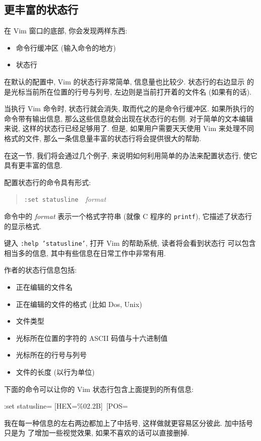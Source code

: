 \subsection{更丰富的状态行}
\label{subsec:a_more_informative_status_line}
在 Vim 窗口的底部, 你会发现两样东西:
\begin{itemize}
    \item 命令行缓冲区 (输入命令的地方)
    \item 状态行
\end{itemize}
在默认的配置中, Vim 的状态行非常简单, 信息量也比较少. 状态行的右边显示
的是光标当前所在位置的行号与列号, 左边则是当前打开着的文件名 (如果有的话).

当执行 Vim 命令时, 状态行就会消失, 取而代之的是命令行缓冲区. 如果所执行的
命令带有输出信息, 那么这些信息就会出现在状态行的右侧.
对于简单的文本编辑来说, 这样的状态行已经足够用了. 但是, 如果用户需要天天使用
Vim 来处理不同格式的文件, 那么一条信息量丰富的状态行将会提供很大的帮助.

在这一节, 我们将会通过几个例子, 来说明如何利用简单的办法来配置状态行, 使它
具有更丰富的信息.

配置状态行的命令具有形式:
\begin{quotation}
\texttt{:set statusline}\ \ \textit{format}
\end{quotation}
命令中的 \textit{format} 表示一个格式字符串 (就像 C 程序的 \texttt{printf}),
它描述了状态行的显示格式.

键入 \texttt{:help 'statusline'}, 打开 Vim 的帮助系统, 读者将会看到状态行
可以包含相当多的信息, 其中有些信息在日常工作中非常有用.

作者的状态行信息包括:
\begin{itemize}
    \item 正在编辑的文件名
    \item 正在编辑的文件的格式 (比如 Dos, Unix)
    \item 文件类型
    \item 光标所在位置的字符的 ASCII 码值与十六进制值
    \item 光标所在的行号与列号
    \item 文件的长度 (以行为单位)
\end{itemize}
下面的命令可以让你的 Vim 状态行包含上面提到的所有信息:
\begin{vimcmd}
:set statusline=%
 [HEX=\%02.2B]\ [POS=%
\end{vimcmd}
我在每一种信息的左右两边都加上了中括号, 这样做就更容易区分彼此. 加中括号只是为
了增加一些视觉效果, 如果不喜欢的话可以直接删掉.

